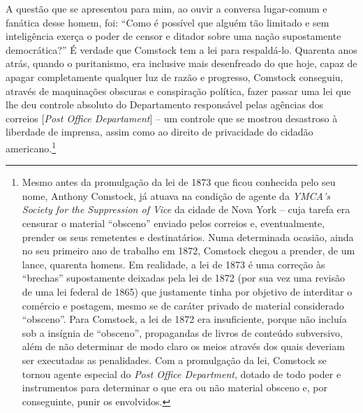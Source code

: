 A questão que se apresentou para mim, ao ouvir a conversa lugar-comum e
fanática desse homem, foi: ``Como é possível que alguém tão limitado e
sem inteligência exerça o poder de censor e ditador sobre uma nação
supostamente democrática?'' É verdade que Comstock tem a lei para
respaldá-lo. Quarenta anos atrás, quando o puritanismo, era inclusive
mais desenfreado do que hoje, capaz de apagar completamente qualquer luz
de razão e progresso, Comstock conseguiu, através de maquinações
obscuras e conspiração política, fazer passar uma lei que lhe deu
controle absoluto do Departamento responsável pelas agências dos
correios {[}\emph{Post Office Departament}{]} -- um controle que se
mostrou desastroso à liberdade de imprensa, assim como ao direito de
privacidade do cidadão americano.\footnote{Mesmo antes da promulgação da
  lei de 1873 que ficou conhecida pelo seu nome, Anthony Comstock, já
  atuava na condição de agente da \emph{YMCA's Society for the
  Suppression of Vice} da cidade de Nova York -- cuja tarefa era
  censurar o material ``obsceno'' enviado pelos correios e,
  eventualmente, prender os seus remetentes e destinatários. Numa
  determinada ocasião, ainda no seu primeiro ano de trabalho em 1872,
  Comstock chegou a prender, de um lance, quarenta homens. Em realidade,
  a lei de 1873 é uma correção às ``brechas'' supostamente deixadas pela
  lei de 1872 (por sua vez uma revisão de uma lei federal de 1865) que
  justamente tinha por objetivo de interditar o comércio e postagem,
  mesmo se de caráter privado de material considerado ``obsceno''. Para
  Comstock, a lei de 1872 era insuficiente, porque não incluía sob a
  insígnia de ``obsceno'', propagandas de livros de conteúdo subversivo,
  além de não determinar de modo claro os meios através dos quais
  deveriam ser executadas as penalidades. Com a promulgação da lei,
  Comstock se tornou agente especial do \emph{Post Office Department},
  dotado de todo poder e instrumentos para determinar o que era ou não
  material obsceno e, por conseguinte, punir os envolvidos.}

